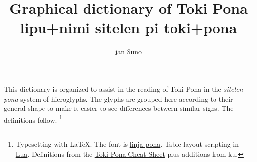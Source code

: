 \documentclass{article}
\title{Graphical dictionary of Toki Pona \\[1ex]{\tpf lipu+nimi sitelen pi toki+pona}}
\author{jan Suno}
\begin{document}
\maketitle
This dictionary is organized to assist in the reading of
Toki Pona in the \textit{sitelen} \textit{pona}
system of hieroglyphs.  The glyphs are grouped here
according to their general shape to make it easier to
see differences between similar signs.  The definitions
follow.
\footnote{Typesetting with LaTeX.  The font is
  \href{http://musilili.net/linja-ponaw/}{linja pona}.
  Table layout scripting in
  \href{http://lua.org}{Lua}.  Definitions from the
  \href{https://blinry.org/toki-pona-cheat-sheet}{Toki Pona Cheat Sheet}
  plus additions from ku.}


\pagebreak
\newcommand\tpDef[2]{\textbf{#1} {\large\tpf #1} #2}
\end{document}
